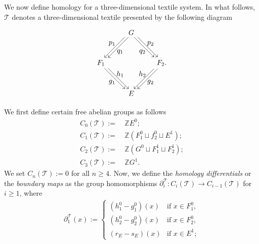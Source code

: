 \documentclass[a4paper,reqno,12pt]{amsart}
\theoremstyle{definition}
\theoremstyle{remark}
\def\mT{\mathcal{T}}
\begin{document}
We now define homology for a three-dimensional textile system. In what follows, $\mathcal{T}$ denotes a three-dimensional textile presented by the following diagram
\[
\begin{tikzpicture}[scale=1]
\node[inner sep=2.5pt, circle] (B) at (-1.5,0) {$F_1$};
\node[inner sep=2.5pt, circle] (C) at (1.5,0) {$F_2$.};	
\node[inner sep=2.5pt, circle] (D) at (0,-1.5) {$E$};
\node[inner sep=2.5pt, circle] (A) at (0,1.5) {$G$}; 

\draw[transform canvas={xshift=0.6ex}, ->] (A) -- (B);
\draw[transform canvas={xshift=-0.6ex}, ->] (A) -- (B);

\draw[transform canvas={xshift=0.6ex}, ->] (A) -- (C);
\draw[transform canvas={xshift=-0.6ex}, ->] (A) -- (C);

\draw[transform canvas={xshift=0.6ex}, ->] (C) -- (D);
\draw[transform canvas={xshift=-0.6ex}, ->] (C) -- (D);

\draw[transform canvas={xshift=0.6ex}, ->] (B) -- (D);
\draw[transform canvas={xshift=-0.6ex}, ->] (B) -- (D);

\node at (-0.55,0.55) {$q_1$};
\node at (-0.95,0.95) {$p_1$};

\node at (0.55,0.55) {$q_2$};
\node at (0.95,0.95) {$p_2$};

\node at (-0.55,-0.55) {$h_1$};
\node at (-0.95,-0.95) {$g_1$};

\node at (0.55,-0.55) {$h_2$};
\node at (0.95,-0.95) {$g_2$};
\end{tikzpicture}
\]
We first define certain free abelian groups as follows
\begin{align*}
C_0(\mathcal{T}):=&~\mathbb{Z}E^0;\\
C_1(\mT):=&~\mathbb{Z}(F_1^0\sqcup f_2^0\sqcup E^1);\\
C_2(\mT):=&~\mathbb{Z}(G^0\sqcup F_1^1\sqcup F_2^1);\\
C_3(\mT):=&~\mathbb{Z}G^1.
\end{align*}
We set $C_n(\mT):=0$ for all $n\ge 4$. Now, we define the \emph{homology differentials} or the \emph{boundary maps} as the group homomorphisms $\partial_i^\mT:C_i(\mT)\longrightarrow C_{i-1}(\mT)$ for $i\ge 1$, where 
\begin{align*}
\partial_1^\mT(x):=
	\left\{
	\begin{array}{lll}
		(h_1^0-g_1^0)(x)  & \mbox{if } x\in F_1^0,\\
		(h_2^0-g_2^0)(x)  & \mbox{if } x\in F_2^0,\\
        (r_E-s_E)(x)  & \mbox{if } x\in E^1;
	\end{array}
	\right.
\end{align*}
\end{document}

